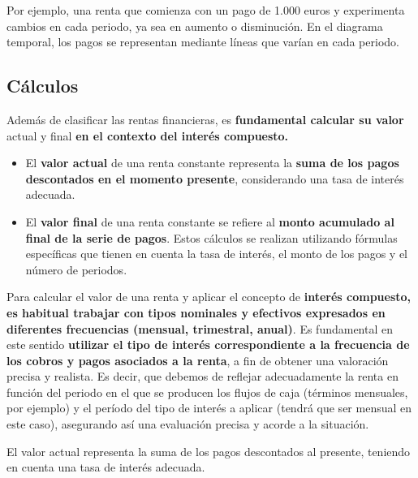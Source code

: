 \documentclass[
  letterpaper,
  DIV=11,
  numbers=noendperiod]{scrartcl}
\begin{document}
Por ejemplo, una renta que comienza con un pago de 1.000 euros y
experimenta cambios en cada periodo, ya sea en aumento o disminución. En
el diagrama temporal, los pagos se representan mediante líneas que
varían en cada periodo.

\hypertarget{cuxe1lculos}{%
\subsection{Cálculos}\label{cuxe1lculos}}

Además de clasificar las rentas financieras, es \textbf{fundamental
calcular su valor} actual y final \textbf{en el contexto del interés
compuesto.}

\begin{itemize}
\item
  El \textbf{valor actual} de una renta constante representa la
  \textbf{suma de los pagos descontados en el momento presente},
  considerando una tasa de interés adecuada.
\item
  El \textbf{valor final} de una renta constante se refiere al
  \textbf{monto acumulado al final de la serie de pagos}. Estos cálculos
  se realizan utilizando fórmulas específicas que tienen en cuenta la
  tasa de interés, el monto de los pagos y el número de periodos.
\end{itemize}

Para calcular el valor de una renta y aplicar el concepto de
\textbf{interés compuesto, es habitual trabajar con tipos nominales y
efectivos expresados en diferentes frecuencias (mensual, trimestral,
anual)}. Es fundamental en este sentido \textbf{utilizar el tipo de
interés correspondiente a la frecuencia de los cobros y pagos asociados
a la renta}, a fin de obtener una valoración precisa y realista. Es
decir, que debemos de reflejar adecuadamente la renta en función del
periodo en el que se producen los flujos de caja (términos mensuales,
por ejemplo) y el período del tipo de interés a aplicar (tendrá que ser
mensual en este caso), asegurando así una evaluación precisa y acorde a
la situación.

El valor actual representa la suma de los pagos descontados al presente,
teniendo en cuenta una tasa de interés adecuada.
\end{document}
